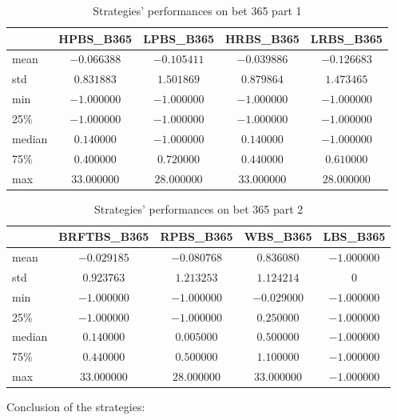 \documentclass[preprint,aps,nofootinbib,a4paper,superscriptaddress,longbibliography,amsfonts,amssymb,amsmath,titlepage]{revtex4-2}
\begin{document}
\begin{table}[h]
\centering
\caption{Strategies' performances on bet 365 part 1}
\begin{tabular}{|l|c|c|c|c|}
\hline
& \textbf{HPBS\_B365} & \textbf{LPBS\_B365} & \textbf{HRBS\_B365} & \textbf{LRBS\_B365} \\
\hline
mean & $-0.066388$ & $-0.105411$ & $-0.039886$ & $-0.126683$ \\
\hline
std & $0.831883$ & $1.501869$ & $0.879864$ & $1.473465$ \\
\hline
min & $-1.000000$ & $-1.000000$ & $-1.000000$ & $-1.000000$ \\
\hline
25\% & $-1.000000$ & $-1.000000$ & $-1.000000$ & $-1.000000$ \\
\hline
median & $0.140000$ & $-1.000000$ & $0.140000$ & $-1.000000$ \\
\hline
75\% & $0.400000$ & $0.720000$ & $0.440000$ & $0.610000$ \\
\hline
max & $33.000000$ & $28.000000$ & $33.000000$ & $28.000000$ \\
\hline
\end{tabular}

\label{strategies-preformance-b365-1}
\end{table}
%
%
\begin{table}[h]
\centering
\caption{Strategies' performances on bet 365 part 2}
\begin{tabular}{|l|c|c|c|c|}
\hline
& \textbf{BRFTBS\_B365} & \textbf{RPBS\_B365} & \textbf{WBS\_B365} & \textbf{LBS\_B365} \\
\hline
mean & $-0.029185$ & $-0.080768$ & $0.836080$ & $-1.000000$ \\
\hline
std & $0.923763$ & $1.213253$ & $1.124214$ & $0$ \\
\hline
min & $-1.000000$ & $-1.000000$ & $-0.029000$ & $-1.000000$ \\
\hline
25\% & $-1.000000$ & $-1.000000$ & $0.250000$ & $-1.000000$ \\
\hline
median & $0.140000$ & $0.005000$ & $0.500000$ & $-1.000000$ \\
\hline
75\% & $0.440000$ & $0.500000$ & $1.100000$ & $-1.000000$ \\
\hline
max & $33.000000$ & $28.000000$ & $33.000000$ & $-1.000000$ \\
\hline
\end{tabular}

\label{strategies-preformance-b365-2}
\end{table}
%
Conclusion of the strategies:
%
\end{document}
